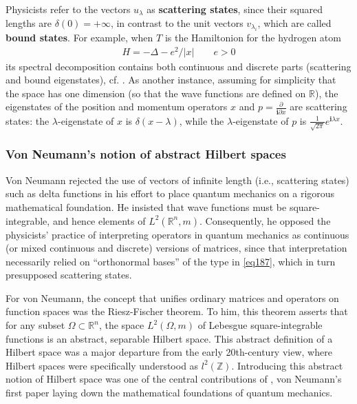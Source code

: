 \documentclass[12pt,b5paper,notitlepage]{article}
\theoremstyle{definition}
\theoremstyle{plain}
\newcommand{\im}{\mathbf{i}}
\newcommand{\Zbb}{\mathbb Z}
\newcommand{\Rbb}{\mathbb R}
\numberwithin{equation}{section}
\begin{document}
Physicists refer to the vectors $u_\lambda$ as \textbf{scattering states}, since their squared lengths are $\delta(0)=+\infty$, in contrast to the unit vectors $v_{\lambda_i}$, which are called \textbf{bound states}. For example, when $T$ is the Hamiltonion for the hydrogen atom
\begin{align*}
H=-\Delta-e^2/|x|\qquad e>0
\end{align*}
its spectral decomposition contains both continuous and discrete parts (scattering and bound eigenstates), cf. \cite[Sec.\ 39]{Dir30}. As another instance, assuming for simplicity that the space has one dimension (so that the wave functions are defined on $\Rbb$), the eigenstates of the position and momentum operators $x$ and $p=\frac{\partial}{\im\partial x}$ are scattering states: the $\lambda$-eigenstate of $x$ is $\delta(x-\lambda)$, while the $\lambda$-eigenstate of $p$ is $\frac 1{\sqrt{2\pi}}e^{\im\lambda x}$.



\subsubsection{Von Neumann's notion of abstract Hilbert spaces}


Von Neumann rejected the use of vectors of infinite length (i.e., scattering states) such as delta functions in his effort to place quantum mechanics on a rigorous mathematical foundation. He insisted that wave functions must be square-integrable, and hence elements of $L^2(\Rbb^n,m)$. Consequently, he opposed the physicists' practice of interpreting operators in quantum mechanics as continuous (or mixed continuous and discrete) versions of matrices, since that interpretation necessarily relied on ``orthonormal bases'' of the type in \eqref{eq187}, which in turn presupposed scattering states.

For von Neumann, the concept that unifies ordinary matrices and operators on function spaces was the Riesz-Fischer theorem. To him, this theorem asserts that for any subset $\Omega\subset\Rbb^n$, the space $L^2(\Omega,m)$ of Lebesgue square-integrable functions is an abstract, separable Hilbert space. This abstract definition of a Hilbert space was a major departure from the early 20th-century view, where Hilbert spaces were specifically understood as $l^2(\Zbb)$. Introducing this abstract notion of Hilbert space was one of the central contributions of \cite{vN27}, von Neumann's first paper laying down the mathematical foundations of quantum mechanics.
\end{document}
